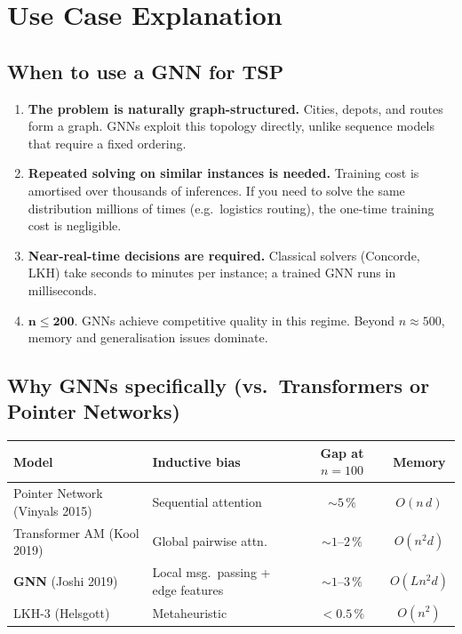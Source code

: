 \documentclass[12pt,a4paper]{article}
\begin{document}
\section{Use Case Explanation}

\subsection*{When to use a GNN for TSP}

\begin{enumerate}[leftmargin=2em]
  \item \textbf{The problem is naturally graph-structured.}
    Cities, depots, and routes form a graph.
    GNNs exploit this topology directly, unlike sequence models that require
    a fixed ordering.

  \item \textbf{Repeated solving on similar instances is needed.}
    Training cost is amortised over thousands of inferences.
    If you need to solve the same distribution millions of times
    (e.g.\ logistics routing), the one-time training cost is negligible.

  \item \textbf{Near-real-time decisions are required.}
    Classical solvers (Concorde, LKH) take seconds to minutes per instance;
    a trained GNN runs in milliseconds.

  \item $\boldsymbol{n \leq 200}$.
    GNNs achieve competitive quality in this regime.
    Beyond $n \approx 500$, memory and generalisation issues dominate.
\end{enumerate}

\subsection*{Why GNNs specifically (vs.\ Transformers or Pointer Networks)}

\begin{center}
\begin{tabularx}{\linewidth}{lXcc}
\toprule
\textbf{Model} & \textbf{Inductive bias} & \textbf{Gap at $n=100$} & \textbf{Memory} \\
\midrule
Pointer Network (Vinyals 2015) & Sequential attention  & $\sim 5\,\%$ & $O(n\,d)$ \\
Transformer AM (Kool 2019)     & Global pairwise attn. & $\sim 1$--$2\,\%$ & $O(n^2 d)$ \\
\textbf{GNN} (Joshi 2019)      & Local msg.\ passing + edge features & $\sim 1$--$3\,\%$ & $O(Ln^2 d)$ \\
LKH-3 (Helsgott)               & Metaheuristic & $< 0.5\,\%$ & $O(n^2)$ \\
\bottomrule
\end{tabularx}
\end{center}
\end{document}
